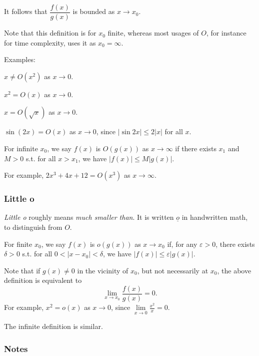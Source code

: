 \documentclass[12pt]{article}
\begin{document}
It follows that $\dfrac{f(x)}{g(x)}$ is bounded as $x \to x_{0}$.

Note that this definition is for $x_{0}$ finite,
whereas most usages of $O$, for instance for time complexity,
uses it as $x_{0} = \infty$.

Examples:
\begin{compactitem}
    \item $x \ne O(x^{2})$ as $x \to 0$.
    \item $x^{2} = O(x)$ as $x \to 0$.
    \item $x = O(\sqrt{x})$ as $x \to 0$.
    \item $\sin(2x) = O(x)$ as $x \to 0$, since $|\sin 2x| \le 2|x|$ for all $x$.
\end{compactitem}

\begin{definition}
    For infinite $x_{0}$, we say
    $f(x)$ is $O(g(x))$ as $x \to \infty$
    if there exists $x_{1}$ and $M > 0$ s.t.
    for all $x > x_{1}$, we have
    $|f(x)| \le M|g(x)|$.
\end{definition}

For example, $2x^{3}+4x+12 = O(x^{3})$ as $x \to \infty$.

\subsubsection*{Little o}
\emph{Little o} roughly means \emph{much smaller than}.
It is written $\underline{o}$ in handwritten math, 
to distinguish from $O$.

\begin{definition}
    For finite $x_{0}$, we say
    $f(x)$ is $o(g(x))$ as $x \to x_{0}$ if,
    for any $\varepsilon > 0$, there exists $\delta >0$ s.t.
    for all $0 < |x - x_{0}| < \delta $,
    we have $|f(x)| \le \varepsilon |g(x)|$.
\end{definition}

Note that if $g(x) \ne 0$ in the vicinity of $x_{0}$,
but not necessarily at $x_{0}$, the above definition is equivalent to
\[
\lim\limits_{x\to x_{0}} \frac{f(x)}{g(x)} = 0.
\]
For example, $x^{2} = o(x)$ as $x \to 0$, since $\lim\limits_{x \to 0} \frac{x^{2}}{x} = 0$.

The infinite definition is similar.

\subsubsection*{Notes}
\end{document}
